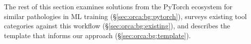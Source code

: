 The rest of this section examines solutions from the PyTorch ecosystem for similar pathologies in
ML training (\S\ref{sec:orca:bg:pytorch}), surveys existing tool categories against this workflow
(\S\ref{sec:orca:bg:existing}), and
describes the template that informs our approach (\S\ref{sec:orca:bg:template}).




